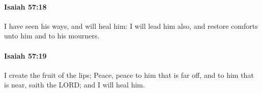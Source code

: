 		\paragraph{Isaiah 57:18} %
			\label{ISAIAH-57-18}

			I have seen his ways, and will heal him: I will lead him also, and restore comforts unto him and to his mourners.


		\paragraph{Isaiah 57:19} %
			\label{ISAIAH-57-19}

			I create the fruit of the lips; Peace, peace to him that is far off, and to him that is near, saith the LORD; and I will heal him.


